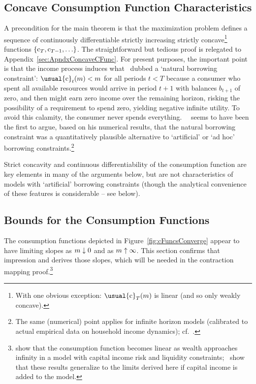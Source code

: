 \documentclass[BufferStockTheory]{subfiles}
\begin{document}
\hypertarget{\figFile}{}
\hypertarget{\figName}{}

\subsection{Concave Consumption Function Characteristics}\label{sec:cExists}

A precondition for the main theorem is that the maximization problem defines a sequence of continuously differentiable strictly increasing strictly concave\footnote{With one obvious exception: $\usual{\cFunc}_{T}(\mNrm)$ is linear (and so only weakly concave).} functions $\{\mathrm{c}_{T},\mathrm{c}_{T-1},\ldots\}$.  The straightforward but tedious proof is relegated to Appendix~\ref{sec:ApndxConcaveCFunc}.  For present purposes, the important point is that the income process induces what~\cite{aiyagari:ge} dubbed a `natural borrowing constraint':  $\usual{\cFunc}_{t}(\mNrm) < m$ for all periods $t < T$ because a consumer who spent all available resources would arrive in period $t+1$ with balances $b_{t+1}$ of zero, and then might earn zero income over the remaining horizon, risking the possibility of a requirement to spend zero, yielding negative infinite utility.  To avoid this calamity, the consumer never spends everything.~~\cite{zeldesStochastic} seems to have been the first to argue, based on his numerical results, that the natural borrowing constraint was a quantitatively plausible alternative to `artificial' or `ad hoc' borrowing constraints.\footnote{The same (numerical) point applies for infinite horizon models (calibrated to actual empirical data on household income dynamics); cf.~\cite{carrollBrookings}.}

Strict concavity and continuous differentiability of the consumption function are key elements in many of the arguments below, but are not characteristics of models with `artificial' borrowing constraints (though the analytical convenience of these features is considerable -- see below).

\hypertarget{Bounds-for-the-Consumption-Functions}{}
\subsection{Bounds for the Consumption Functions}\label{subsec:cFuncBounds}

The consumption functions depicted in Figure~\ref{fig:cFuncsConverge} appear to have limiting slopes as $m \downarrow 0$ and as $m \uparrow \infty$.  This section confirms that impression and derives those slopes, which will be needed in the contraction mapping proof.\footnote{\cite{benhabibWealth} show that the consumption function becomes linear as wealth approaches infinity in a model with capital income risk and liquidity constraints;~\cite{maTodaRich} show that these results generalize to the limits derived here if capital income is added to the model.}
\end{document}
